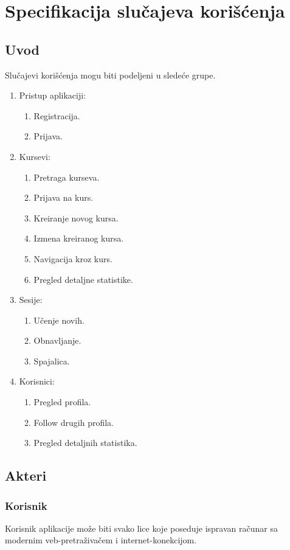 \part{Specifikacija slučajeva korišćenja}

\chapter{Uvod}
Slučajevi korišćenja mogu biti podeljeni u sledeće grupe.
\begin{enumerate}
  \item Pristup aplikaciji:
  \begin{enumerate}
    \item Registracija.
    \item Prijava.
  \end{enumerate}
  \item Kursevi:
  \begin{enumerate}
    \item Pretraga kurseva.
    \item Prijava na kurs.
    \item Kreiranje novog kursa.
    \item Izmena kreiranog kursa.
    \item Navigacija kroz kurs.
    \item Pregled detaljne statistike.
  \end{enumerate}
  \item Sesije:
  \begin{enumerate}
    \item Učenje novih.
    \item Obnavljanje.
    \item Spajalica.
  \end{enumerate}
  \item Korisnici:
  \begin{enumerate}
    \item Pregled profila.
    \item Follow drugih profila.
    \item Pregled detaljnih statistika.
  \end{enumerate}
\end{enumerate}



\chapter{Akteri}
\label{ch:akteri}

\section{Korisnik}
\label{sec:korisnik}
Korisnik aplikacije može biti svako lice koje poseduje ispravan računar sa modernim veb-pretraživačem i internet-konekcijom.



